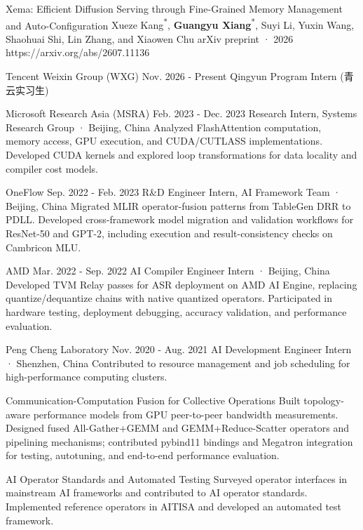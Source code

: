 \documentclass[10pt,a4paper]{article}
\begin{document}
\cvpublication
  {Xema: Efficient Diffusion Serving through Fine-Grained Memory Management and Auto-Configuration}
  {Xueze Kang\textsuperscript{*}, \textbf{Guangyu Xiang}\textsuperscript{*}, Suyi Li, Yuxin Wang, Shaohuai Shi, Lin Zhang, and Xiaowen Chu}
  {arXiv preprint · 2026}
  {https://arxiv.org/abs/2607.11136}



\cventry
  {Tencent Weixin Group (WXG)}
  {Nov. 2026 - Present}
  {Qingyun Program Intern ({青云实习生})}
  {}

\cventry
  {Microsoft Research Asia (MSRA)}
  {Feb. 2023 - Dec. 2023}
  {Research Intern, Systems Research Group · Beijing, China}
  {Analyzed FlashAttention computation, memory access, GPU execution, and CUDA/CUTLASS implementations. Developed CUDA kernels and explored loop transformations for data locality and compiler cost models.}

\cventry
  {OneFlow}
  {Sep. 2022 - Feb. 2023}
  {R\&D Engineer Intern, AI Framework Team · Beijing, China}
  {Migrated MLIR operator-fusion patterns from TableGen DRR to PDLL. Developed cross-framework model migration and validation workflows for ResNet-50 and GPT-2, including execution and result-consistency checks on Cambricon MLU.}

\cventry
  {AMD}
  {Mar. 2022 - Sep. 2022}
  {AI Compiler Engineer Intern · Beijing, China}
  {Developed TVM Relay passes for ASR deployment on AMD AI Engine, replacing quantize/dequantize chains with native quantized operators. Participated in hardware testing, deployment debugging, accuracy validation, and performance evaluation.}

\cventry
  {Peng Cheng Laboratory}
  {Nov. 2020 - Aug. 2021}
  {AI Development Engineer Intern · Shenzhen, China}
  {Contributed to resource management and job scheduling for high-performance computing clusters.}


\cvproject
  {Communication-Computation Fusion for Collective Operations}
  {Built topology-aware performance models from GPU peer-to-peer bandwidth measurements. Designed fused All-Gather+GEMM and GEMM+Reduce-Scatter operators and pipelining mechanisms; contributed pybind11 bindings and Megatron integration for testing, autotuning, and end-to-end performance evaluation.}

\cvproject
  {AI Operator Standards and Automated Testing}
  {Surveyed operator interfaces in mainstream AI frameworks and contributed to AI operator standards. Implemented reference operators in AITISA and developed an automated test framework.}


\end{document}
